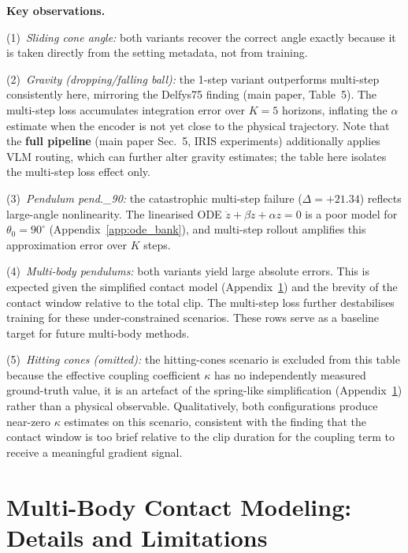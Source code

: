 \documentclass[runningheads]{llncs}
\begin{document}
\textbf{Key observations.}

\noindent(1)~\textit{Sliding cone angle:} both variants recover the correct
angle exactly because it is taken directly from the setting metadata,
not from training.

\noindent(2)~\textit{Gravity (dropping/falling ball):} the 1-step variant
outperforms multi-step consistently here, mirroring the Delfys75 finding
(main paper, Table~5).  The multi-step loss accumulates integration error
over $K{=}5$ horizons, inflating the $\alpha$ estimate when the encoder
is not yet close to the physical trajectory.  Note that the
\textbf{full pipeline} (main paper Sec.~5, IRIS experiments) additionally applies VLM
routing, which can further alter gravity estimates;
the table here isolates the multi-step loss effect only.

\noindent(3)~\textit{Pendulum pend.\_90:} the catastrophic multi-step
failure ($\Delta = +21.34$) reflects large-angle nonlinearity.  The
linearised ODE $\ddot{z} + \beta\dot{z} + \alpha z = 0$ is a poor model
for $\theta_0 = 90^\circ$ (Appendix~\ref{app:ode_bank}), and multi-step
rollout amplifies this approximation error over $K$ steps.

\noindent(4)~\textit{Multi-body pendulums:} both variants yield large
absolute errors.  This is expected given the simplified contact model
(Appendix~\ref{app:multibody}) and the brevity of the contact window
relative to the total clip.  The multi-step loss further destabilises
training for these under-constrained scenarios.  These rows serve as
a baseline target for future multi-body methods.

\noindent(5)~\textit{Hitting cones (omitted):} the hitting-cones scenario
is excluded from this table because the effective coupling coefficient
$\kappa$ has no independently measured ground-truth value, it is an
artefact of the spring-like simplification (Appendix~\ref{app:multibody})
rather than a physical observable.  Qualitatively, both configurations
produce near-zero $\kappa$ estimates on this scenario, consistent with
the finding that the contact window is too brief relative to the clip
duration for the coupling term to receive a meaningful gradient signal.


\section{Multi-Body Contact Modeling: Details and Limitations}
\label{app:multibody}
\end{document}
